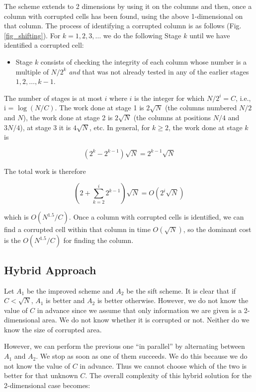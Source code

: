 \documentclass{llncs}
\begin{document}
The scheme extends to 2 dimensions by using it
on the columns and then, once a column with corrupted
cells has been found, using the above 1-dimensional 
on that column.  The process of
identifying a corrupted column is as follows (Fig. \ref{fig_shifting}). 
For $k = 1 , 2, 3 , \ldots$ we do the following
Stage $k$ until we have identified a corrupted cell:

\begin{itemize}
\item
Stage $k$ consists of checking the integrity of
each column whose number is a multiple of $N/2^k$
{\em and} that was not already tested in any of
the earlier stages $1 , 2 , \ldots , k-1$.
\end{itemize}

The number of stages is at most $i$ where
$i$ is the integer for which
$N/2^i = C$, i.e., i = $\log ( N / C )$.
The work done at stage 1 is $2 \sqrt{N}$ (the columns 
numbered $N/2$ and $N$), the work done at stage 2 is $2 \sqrt{N}$
(the columns at positions $N/4$ and $3N/4$), at stage 3
it is $4 \sqrt{N}$, etc.  In general,
for $k \geq 2$, the work done at stage $k$ is 

$$( 2^k - 2^{k-1} ) \sqrt{N} = 2^{k-1} \sqrt{N}$$

The total work is therefore

$$ ( 2 + \sum_{k=2}^i 2^{k-1} ) \sqrt{N} = O( 2^i \sqrt{N} )$$

\noindent which is $O ( N^{1.5} / C )$.  
Once a column with corrupted cells is identified, 
we can find a corrupted cell within that column
in time $O( \sqrt{N} )$, so the dominant cost
is the $O ( N^{1.5} / C )$ for finding the column.

\subsection{Hybrid Approach}
\label{HybridApproach}
Let $A_1$ be the improved scheme and $A_2$ be the sift scheme.
It is clear that if $C < \sqrt{N}$, $A_1$ is better and $A_2$ is better otherwise.
However, we do not know the value of $C$ in advance
since we assume that only information we are given is a 2-dimensional area.
We do not know whether it is corrupted or not. Neither do we know the size of corrupted area.

However, we can perform the previous one ``in parallel'' 
by alternating between $A_1$ and $A_2$. We stop as soon as one of them succeeds.
We do this because we do not know the value of $C$ in advance.
Thus we cannot choose which of the two is better for that unknown $C$.  
The overall complexity of this hybrid solution for the 2-dimensional case becomes:
\end{document}
